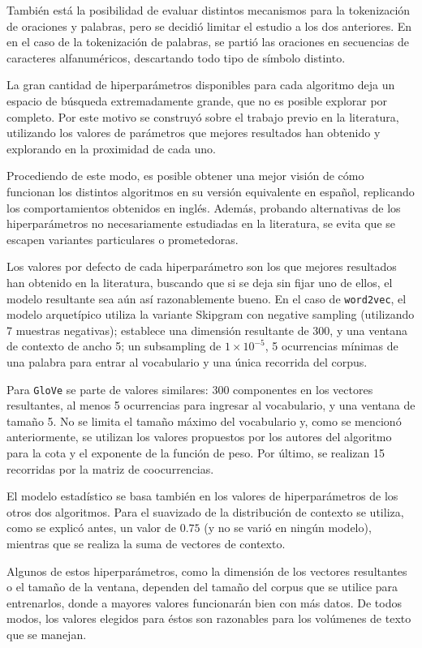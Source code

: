 También está la posibilidad de evaluar distintos mecanismos para la tokenización de oraciones y
palabras, pero se decidió limitar el estudio a los dos anteriores. En en el caso de la tokenización
de palabras, se partió las oraciones en secuencias de caracteres alfanuméricos, descartando todo
tipo de símbolo distinto.


La gran cantidad de hiperparámetros disponibles para cada algoritmo deja un espacio de búsqueda
extremadamente grande, que no es posible explorar por completo. Por este motivo se construyó sobre
el trabajo previo en la literatura, utilizando los valores de parámetros que mejores resultados han
obtenido y explorando en la proximidad de cada uno.

Procediendo de este modo, es posible obtener una mejor visión de cómo funcionan los distintos
algoritmos en su versión equivalente en español, replicando los comportamientos obtenidos en
inglés. Además, probando alternativas de los hiperparámetros no necesariamente estudiadas en la
literatura, se evita que se escapen variantes particulares o prometedoras.

Los valores por defecto de cada hiperparámetro son los que mejores resultados han obtenido en la
literatura, buscando que si se deja sin fijar uno de ellos, el modelo resultante sea aún así
razonablemente bueno. En el caso de \texttt{word2vec}, el modelo arquetípico utiliza la variante
Skipgram con negative sampling (utilizando 7 muestras negativas); establece una dimensión resultante
de 300, y una ventana de contexto de ancho 5; un subsampling de $1\times10^{-5}$, 5 ocurrencias
mínimas de una palabra para entrar al vocabulario y una única recorrida del corpus.

Para \texttt{GloVe} se parte de valores similares: 300 componentes en los vectores resultantes, al
menos 5 ocurrencias para ingresar al vocabulario, y una ventana de tamaño 5. No se limita el tamaño
máximo del vocabulario y, como se mencionó anteriormente, se utilizan los valores propuestos por los
autores del algoritmo para la cota y el exponente de la función de peso. Por último, se realizan 15
recorridas por la matriz de coocurrencias.

El modelo estadístico se basa también en los valores de hiperparámetros de los otros dos
algoritmos. Para el suavizado de la distribución de contexto se utiliza, como se explicó antes, un
valor de $0.75$ (y no se varió en ningún modelo), mientras que se realiza la suma de vectores de
contexto.

Algunos de estos hiperparámetros, como la dimensión de los vectores resultantes o el tamaño de la
ventana, dependen del tamaño del corpus que se utilice para entrenarlos, donde a mayores valores
funcionarán bien con más datos. De todos modos, los valores elegidos para éstos son razonables para
los volúmenes de texto que se manejan.

